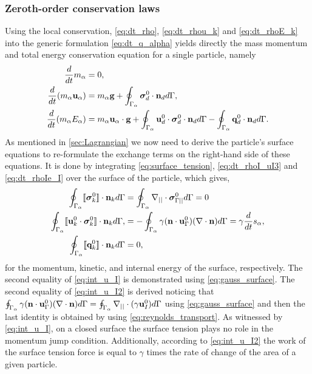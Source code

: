 

\subsubsection{Zeroth-order conservation laws}

Using the local conservation, \ref{eq:dt_rho}, \ref{eq:dt_rhou_k} and \ref{eq:dt_rhoE_k} into the generic formulation \ref{eq:dt_q_alpha} yields directly the mass momentum and total energy conservation equation for a single particle, namely
\begin{align}
    \frac{d}{dt} m_\alpha
    &= 
    0,\\
    \frac{d}{dt} (m_\alpha \textbf{u}_\alpha)
    &= 
    m_\alpha\textbf{g}
    +  \oint_{\Gamma_{\alpha}} \bm{\sigma}_d^0 \cdot \textbf{n}_d d\Gamma,\\
    \frac{d}{dt} (m_\alpha E_\alpha)
    &= 
    m_\alpha \textbf{u}_\alpha \cdot \textbf{g}
    +\oint_{\Gamma_{\alpha}} \textbf{u}_d^0 \cdot \bm{\sigma}_d^0 \cdot  \textbf{n}_d d\Gamma 
    - \oint_{\Gamma_{\alpha}} \textbf{q}_d^0 \cdot \textbf{n}_d d\Gamma. 
\end{align}
As mentioned in \ref{sec:Lagrangian} we now need to derive the particle's surface equations to re-formulate the exchange terms on the right-hand side of these equations. 
It is done by integrating \ref{eq:surface_tension}, \ref{eq:dt_rhoI_uI3} and  \ref{eq:dt_rhoIe_I}  over the surface of the particle, which gives,  
\begin{align}
    \label{eq:int_u_I}
    \intS{\Jump{\bm{\sigma}_k^0} }
    &=
    \intS{\divI\bm\sigma^0_{\Gamma||}} = 0\\
    \label{eq:int_u_I2}
    \intS{\Jump{\textbf{u}_k^0 \cdot \bm{\sigma}_k^0}},
    &=
    -\intS{\gamma(\textbf{n}\cdot \textbf{u}_{\Gamma}^0)(\div \textbf{n})}
    = \gamma \ddt s_\alpha,\\
    \label{eq:int_q_I}
    \intS{\Jump{\textbf{q}_k^0}}
    &=
    0,
\end{align}
for the momentum, kinetic, and internal energy of the surface, respectively. 
The second equality of \ref{eq:int_u_I} is demonstrated using \ref{eq:gauss_surface}. 
The second equality of \ref{eq:int_u_I2} is derived noticing that $\oint_{\Gamma_{\alpha}} \gamma(\textbf{n}\cdot \textbf{u}_{\Gamma}^0)(\mathbf{\nabla}\cdot \textbf{n}) d\Gamma = \oint_{\Gamma_{\alpha}} \mathbf{\nabla}_{||}\cdot (\gamma \textbf{u}_I^0) d\Gamma $ using \ref{eq:gauss_surface} and then the last identity is obtained by using \ref{eq:reynolds_transport}. 
As witnessed by \ref{eq:int_u_I}, on a closed surface the surface tension plays no role in the momentum jump condition.
Additionally, according to \ref{eq:int_u_I2} the work of the surface tension force is equal to $\gamma$ times the rate of change of the area of a given particle. 

